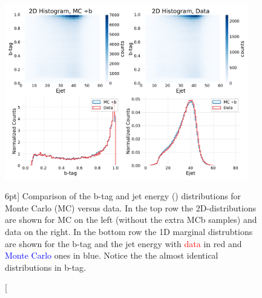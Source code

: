 \documentclass[a4paper, twoside]{tufte-book}
\newcommand{\code}[1]{\colorbox{light-gray}{\texttt{\detokenize{#1}}}}
\begin{document}
\begin{figure}
  \includegraphics[width=0.95\textwidth, trim=0 0 0 40, clip]{figures/quarks/2d-histograms-ejet-btag-comparison-down_sample=1.00-ML_vars=vertex-selection=b-ejet_min=4-n_iter_RS_lgb=99-n_iter_RS_xgb=9-cdot_cut=0.90-version=19-njet=3.pdf}
  \caption[Monte Carlo -- Data bias for b-tags and jet energy][6pt]
          {Comparison of the b-tag and jet energy (\code{Ejet}) distributions for Monte Carlo (MC) versus data. In the top row the 2D-distributions are shown for MC on the left (without the extra MCb samples) and data on the right. In the bottom row the 1D marginal distrubtions are shown for the b-tag and the jet energy with \textcolor{red}{data} in red and \textcolor{blue}{Monte Carlo} ones in blue. Notice the the almost identical distributions in b-tag. 
          } 
  \label{fig:q:btag_Ejet_comparison}
\end{figure}
\end{document}
